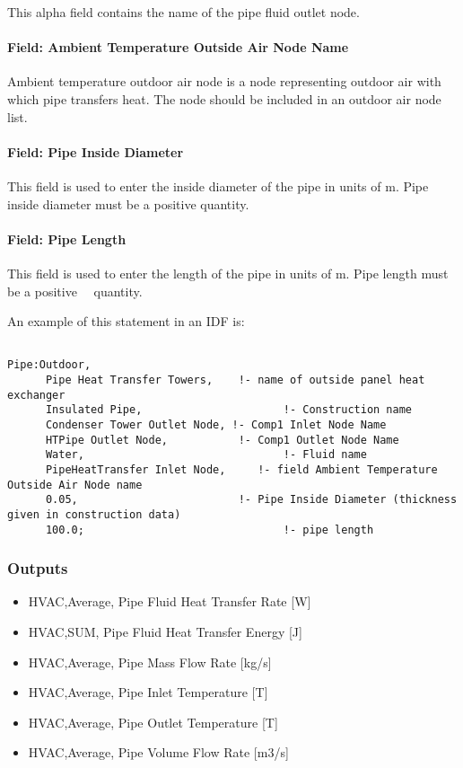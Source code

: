 This alpha field contains the name of the pipe fluid outlet node.

\paragraph{Field: Ambient Temperature Outside Air Node Name}\label{field-ambient-temperature-outside-air-node-name}

Ambient temperature outdoor air node is a node representing outdoor air with which pipe transfers heat. The node should be included in an outdoor air node list.

\paragraph{Field: Pipe Inside Diameter}\label{field-pipe-inside-diameter-1}

This field is used to enter the inside diameter of the pipe in units of m. Pipe inside diameter must be a positive quantity.

\paragraph{Field: Pipe Length}\label{field-pipe-length-1}

This field is used to enter the length of the pipe in units of m. Pipe length must be a positive~~ quantity.

An example of this statement in an IDF is:

\begin{lstlisting}

Pipe:Outdoor,
      Pipe Heat Transfer Towers,    !- name of outside panel heat exchanger
      Insulated Pipe,                      !- Construction name
      Condenser Tower Outlet Node, !- Comp1 Inlet Node Name
      HTPipe Outlet Node,           !- Comp1 Outlet Node Name
      Water,                               !- Fluid name
      PipeHeatTransfer Inlet Node,     !- field Ambient Temperature Outside Air Node name
      0.05,                         !- Pipe Inside Diameter (thickness given in construction data)
      100.0;                               !- pipe length
\end{lstlisting}

\subsubsection{Outputs}\label{outputs-7-005}

\begin{itemize}
\item
  HVAC,Average, Pipe Fluid Heat Transfer Rate {[}W{]}
\item
  HVAC,SUM, Pipe Fluid Heat Transfer Energy {[}J{]}
\item
  HVAC,Average, Pipe Mass Flow Rate {[}kg/s{]}
\item
  HVAC,Average, Pipe Inlet Temperature {[}T{]}
\item
  HVAC,Average, Pipe Outlet Temperature {[}T{]}
\item
  HVAC,Average, Pipe Volume Flow Rate {[}m3/s{]}
\end{itemize}

